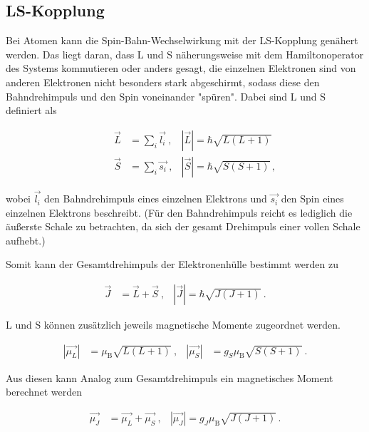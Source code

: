 \subsection{LS-Kopplung}
Bei Atomen kann die Spin-Bahn-Wechselwirkung mit der LS-Kopplung genähert werden. Das liegt daran, dass L und S näherungsweise mit dem Hamiltonoperator des Systems
kommutieren oder anders gesagt, die einzelnen Elektronen sind von anderen Elektronen nicht besonders stark abgeschirmt, sodass diese den Bahndrehimpuls
und den Spin voneinander "spüren". Dabei sind L und S definiert als 

\begin{align}
    \qquad \vec{L} &= \sum_i \vec{l_i} \:, & |\vec{L}| = \hbar \sqrt{L(L+1)}\\
    \qquad \vec{S} &= \sum_i \vec{s_i} \:, & |\vec{S}| = \hbar \sqrt{S(S+1)} \, , 
\end{align}
\vspace{-10pt}

\noindent
wobei $\vec{l_i}$ den Bahndrehimpuls eines einzelnen Elektrons und $\vec{s_i}$ den Spin eines einzelnen Elektrons beschreibt. (Für den Bahndrehimpuls reicht es lediglich
die äußerste Schale zu betrachten, da sich der gesamt Drehimpuls einer vollen Schale aufhebt.)

\noindent
Somit kann der Gesamtdrehimpuls der Elektronenhülle bestimmt werden zu 

\vspace{-15pt}
\begin{align}
    \vec{J} &= \vec{L} + \vec{S} \:, & |\vec{J}| = \hbar \sqrt{J(J+1)} \: .
\end{align}


\noindent
L und S können zusätzlich jeweils magnetische Momente zugeordnet werden. 

\vspace{-15pt}
\begin{align}
 |\vec{\mu_L}|& = \mu_\text{B} \sqrt{L(L+1)} \:, &  |\vec{\mu_S}|& = g_S \mu_\text{B} \sqrt{S(S+1)}\: .
\end{align}

\noindent
Aus diesen kann Analog zum Gesamtdrehimpuls ein magnetisches Moment berechnet werden

\vspace{-15pt}
\begin{align}
    \vec{\mu_J} &= \vec{\mu_L} + \vec{\mu_S} \:, & |\vec{\mu_J}| = g_J \mu_\text{B} \sqrt{J(J+1)} \, .
\end{align}

